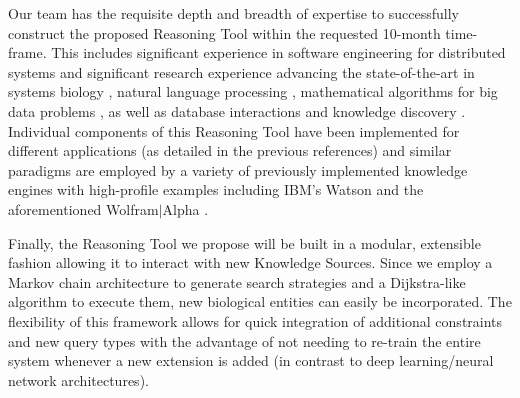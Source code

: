 \documentclass[11pt,notitlepage]{article}
\begin{document}
Our team has the requisite depth and breadth of expertise to successfully
construct the proposed Reasoning Tool within the requested 10-month
time-frame.  This includes significant experience in software engineering for
distributed systems and significant research experience advancing the
state-of-the-art in systems biology
\cite{ramsey2010systems,hwang2005data1,hwang2005data2,de2004evolution}, natural
language processing
\cite{huang2012structured,huang2010dynamic,mi2008forest,huang2007forest},
mathematical algorithms for big data problems
\cite{koslicki2014wgsquikr,holzinger2014entropy,koslicki2015coding,koslicki2013quikr,koslicki2017improving},
as well as database interactions and knowledge discovery
\cite{nandi2011guided,nandi2007effective,jagadish2007making,nandi2007assisted}. Individual
components of this Reasoning Tool have been implemented for different
applications (as detailed in the previous references) and similar paradigms are
employed by a variety of previously implemented knowledge engines with
high-profile examples including IBM's Watson \cite{ferrucci2010building} and the
aforementioned Wolfram$|$Alpha \cite{Wolframalpha}.

Finally, the Reasoning Tool we propose will be built in a modular, extensible
fashion allowing it to interact with new Knowledge Sources. Since we employ a
Markov chain architecture to generate search strategies and a Dijkstra-like
algorithm to execute them, new biological entities can easily be
incorporated. The flexibility of this framework allows for quick integration of
additional constraints and new query types with the advantage of not needing to
re-train the entire system whenever a new extension is added (in contrast to
deep learning/neural network architectures).

\newpage
\end{document}
